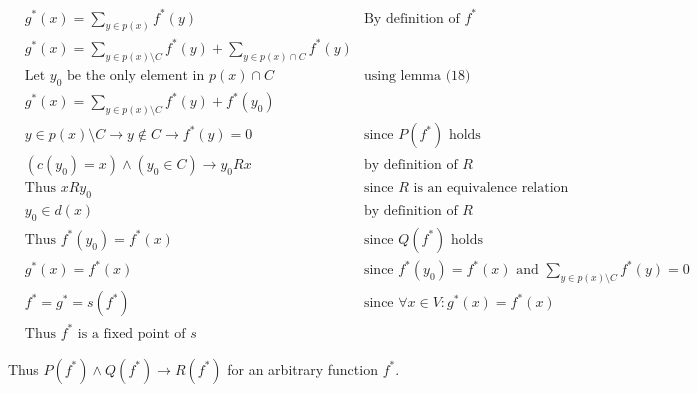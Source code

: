 \documentclass[11pt]{article}
\begin{document}
\begin{align*}
& \text{$g^{*}(x) = \sum_{y \in p(x)} f^{*}(y)$} & \text{By definition of $f^{*}$} \\
& \text{$g^{*}(x) = \sum_{y \in p(x)\setminus C} f^{*}(y) + \sum_{y \in p(x)\cap C} f^{*}(y)$} & \text{} \\
& \text{Let $y_{0}$ be the only element in $p(x)\cap C$} & \text{using lemma (18)} \\
& \text{$g^{*}(x) = \sum_{y \in p(x)\setminus C} f^{*}(y) + f^{*}(y_{0})$} & \text{} \\
& \text{$y \in p(x)\setminus C \rightarrow y \not \in C \rightarrow f^{*}(y)=0$} & \text{since $P(f^{*})$ holds} \\
& \text{$(c(y_{0})=x) \land (y_{0}\in C) \rightarrow y_{0}Rx$} & \text{by definition of $R$} \\
& \text{Thus $xRy_{0}$} & \text{since $R$ is an equivalence relation} \\
& \text{$y_{0} \in d(x)$} & \text{by definition of $R$} \\
& \text{Thus $f^{*}(y_{0}) = f^{*}(x)$} & \text{since $Q(f^{*})$ holds} \\
& \text{$g^{*}(x) = f^{*}(x)$} & \text{since $f^{*}(y_{0}) = f^{*}(x)$ and $\sum_{y \in p(x)\setminus C} f^{*}(y) = 0$} \\
& \text{$f^{*} = g^{*} = s(f^{*})$} & \text{since $\forall x \in V: g^{*}(x) = f^{*}(x)$} \\
& \text{Thus $f^{*}$ is a fixed point of $s$} & \text{}
\end{align*}

Thus $P(f^{*}) \land Q(f^{*}) \rightarrow R(f^{*})$ for an arbitrary function $f^{*}$.
\end{document}

